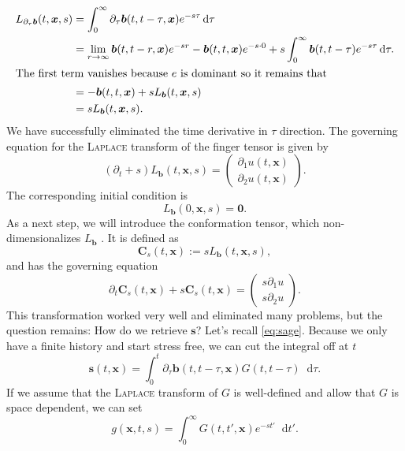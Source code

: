 \documentclass[12pt,a4paper,twoside, open=right]{scrreprt}
\theoremstyle{definition}
\theoremstyle{plain}
\newcommand{\bfb}{\bm{b}}
\newcommand{\bfs}{\bm{s}}
\newcommand{\bfC}{\bm{C}}
\newcommand{\bfx}{\bm{x}}
\newcommand{\D}{\mathop{}\!\mathrm{d}}
\begin{document}
\begin{align}
    L_{\partial_\tau\bfb}(t,\bfx,s) &= \int_0^\infty\partial_\tau\bfb(t,t-\tau,\bfx)e^{-s\tau}\D\tau\\ &=\lim_{r\to\infty}\bfb(t,t-r,\bfx)e^{-sr}-\bfb(t,t,\bfx)e^{-s\cdot 0}+s\int_0^\infty\bfb(t,t-\tau)e^{-s\tau}\D\tau.\\
    \intertext{The first term vanishes because $e$ is dominant so it remains that}
    &= -\bfb(t,t,\bfx) +sL_{\bfb}(t,\bfx, s)\\
    &= sL_{\bfb}(t,\bfx,s).
\end{align}
We have successfully eliminated the time derivative in $\tau$ direction. The governing equation for the \textsc{Laplace} transform of the finger tensor is given by
\begin{equation}
(\partial_t +s)L_{\bfb}(t,\bfx,s) = \begin{pmatrix}
\partial_1 u(t,\bfx)\\\partial_2 u(t,\bfx)
\end{pmatrix}.
\end{equation}
The corresponding initial condition is 
\begin{equation}
    L_{\bfb}(0,\bfx,s) = \bm{0}.
\end{equation} 
As a next step, we will introduce the conformation tensor, which non-dimensionalizes $L_{\bfb}$ . It is defined as 
\begin{equation}
    \bfC_s(t,\bfx) := sL_{\bfb}(t,\bfx,s),
\end{equation}
and has the governing equation
\begin{equation}
    \partial_t\bfC_s(t,\bfx)+s\bfC_s(t,\bfx) =\begin{pmatrix}
    s\partial_1u\\s\partial_2 u
    \end{pmatrix}.
\end{equation}
This transformation worked very well and eliminated many problems, but the question remains: How do we retrieve $\bfs$?
Let's recall \eqref{eq:sage}.
Because we only have a finite history and start stress free, we can cut the integral off at $t$
\begin{equation}
    \bfs(t,\bfx)=\int_0^t\partial_\tau\bfb(t,t-\tau,\bfx)G(t,t-\tau)\D\tau.\label{eq:sagered}
\end{equation}
If we assume that the \textsc{Laplace} transform of $G$ is well-defined and allow that $G$ is space dependent, we can set
\begin{equation}
    g(\bfx,t,s) =\int_0^\infty G(t,t',\bfx)e^{-st'}\D t'.
\end{equation}
\end{document}
